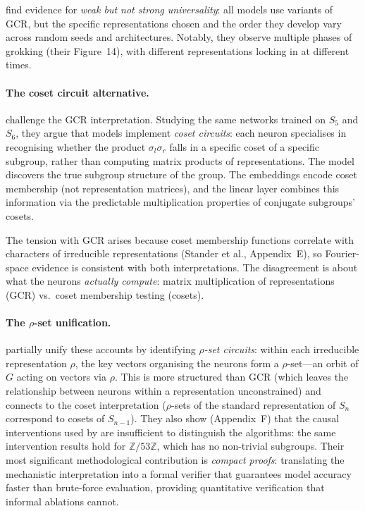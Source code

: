 \documentclass[11pt,a4paper]{article}
\begin{document}
\citet{chughtai2023toy} find evidence for \emph{weak but not strong universality}: all models use variants of GCR, but the specific representations chosen and the order they develop vary across random seeds and architectures. Notably, they observe multiple phases of grokking (their Figure~14), with different representations locking in at different times.

\paragraph{The coset circuit alternative.} \citet{stander2024grokking} challenge the GCR interpretation. Studying the same networks trained on $S_5$ and $S_6$, they argue that models implement \emph{coset circuits}: each neuron specialises in recognising whether the product $\sigma_l \sigma_r$ falls in a specific coset of a specific subgroup, rather than computing matrix products of representations. The model discovers the true subgroup structure of the group. The embeddings encode coset membership (not representation matrices), and the linear layer combines this information via the predictable multiplication properties of conjugate subgroups' cosets.

The tension with GCR arises because coset membership functions correlate with characters of irreducible representations (Stander et al., Appendix~E), so Fourier-space evidence is consistent with both interpretations. The disagreement is about what the neurons \emph{actually compute}: matrix multiplication of representations (GCR) vs.\ coset membership testing (cosets).

\paragraph{The $\rho$-set unification.} \citet{wu2024unified} partially unify these accounts by identifying \emph{$\rho$-set circuits}: within each irreducible representation $\rho$, the key vectors organising the neurons form a $\rho$-set---an orbit of $G$ acting on vectors via $\rho$. This is more structured than GCR (which leaves the relationship between neurons within a representation unconstrained) and connects to the coset interpretation ($\rho$-sets of the standard representation of $S_n$ correspond to cosets of $S_{n-1}$). They also show (Appendix~F) that the causal interventions used by \citet{stander2024grokking} are insufficient to distinguish the algorithms: the same intervention results hold for $\mathbb{Z}/53\mathbb{Z}$, which has no non-trivial subgroups. Their most significant methodological contribution is \emph{compact proofs}: translating the mechanistic interpretation into a formal verifier that guarantees model accuracy faster than brute-force evaluation, providing quantitative verification that informal ablations cannot.
\end{document}
